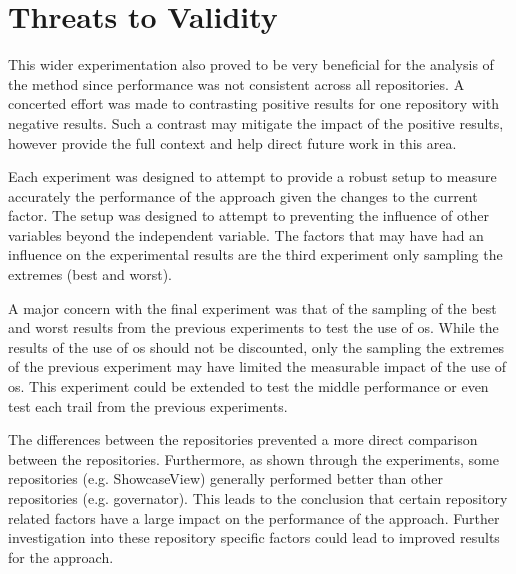  
\clearpage
\section{Threats to Validity}
\label{sec:threat_validity}


This wider experimentation also proved to be very beneficial for the analysis of the method since performance was not consistent across all repositories. A concerted effort was made to contrasting positive results for one repository with negative results. Such a contrast may mitigate the impact of the positive results, however provide the full context and help direct future work in this area.

Each experiment was designed to attempt to provide a robust setup to measure accurately the performance of the approach given the changes to the current factor. The setup was designed to attempt to preventing the influence of other variables beyond the independent variable. The factors that may have had an influence on the experimental results are the third experiment only sampling the extremes (best and worst).

A major concern with the final experiment was that of the sampling of the best and worst results from the previous experiments to test the use of \gls{os}. While the results of the use of \gls{os} should not be discounted, only the sampling the extremes of the previous experiment may have limited the measurable impact of the use of \gls{os}. This experiment could be extended to test the middle performance or even test each trail from the previous experiments.

The differences between the repositories prevented a more direct comparison between the repositories. Furthermore, as shown through the experiments, some repositories (e.g. ShowcaseView) generally performed better than other repositories (e.g. governator). This leads to the conclusion that certain repository related factors have a large impact on the performance of the approach. Further investigation into these repository specific factors could lead to improved results for the approach.